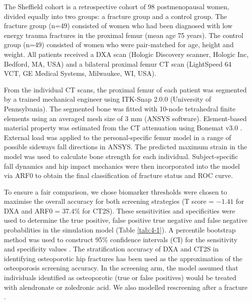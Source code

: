 The Sheffield cohort is a retrospective cohort of 98 postmenopausal women, divided equally into two groups: a fracture group and a control group. The fracture group (n=49) consisted of women who had been diagnosed with low energy trauma fractures in the proximal femur (mean age 75 years). The control group (n=49) consisted of women who were pair-matched for age, height and weight. All patients received a DXA scan (Hologic Discovery scanner, Hologic Inc, Bedford, MA, USA) and a bilateral proximal femur CT scan (LightSpeed 64 VCT, GE Medical Systems, Milwaukee, WI, USA).

From the individual CT scans, the proximal femur of each patient was segmented by a trained mechanical engineer using ITK-Snap 2.0.0 (University of Pennsylvania). The segmented bone was fitted with 10-node tetrahedral finite elements using an averaged mesh size of 3 mm (ANSYS software). Element-based material property was estimated from the CT attenuation using Bonemat v3.0 \cite{4-20,4-21}. External load was applied to the personal-specific femur model in a range of possible sideways fall directions in ANSYS. The predicted maximum strain in the model was used to calculate bone strength for each individual. Subject-specific fall dynamics and hip impact mechanics were then incorporated into the model via ARF0 to obtain the final classification of fracture status and ROC curve.

To ensure a fair comparison, we chose biomarker thresholds were chosen to maximise the overall accuracy for both screening strategies (T score = $-1.41$ for DXA and ARF0 = 37.4\% for CT2S). These sensitivities and specificities were used to determine the true positive, false positive true negative and false negative probabilities in the simulation model (Table \ref{tab:4-1}). A percentile bootstrap method was used to construct 95\% confidence intervals (CI) for the sensitivity and specificity values \cite{4-22}. The stratification accuracy of DXA and CT2S in identifying osteoporotic hip fractures has been used as the approximation of the osteoporosis screening accuracy. In the screening arm, the model assumed that individuals identified as osteoporotic (true or false positives) would be treated with alendronate or zoledronic acid. We also modelled rescreening after a fracture \cite{4-23}.

